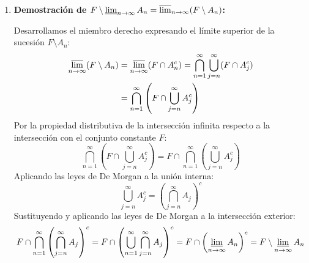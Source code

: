 \begin{problema}
\begin{enumerate}[label=\alph*)]
    Desarrollamos el miembro derecho expresando la diferencia como intersección con el complementario y aplicando la definición de límite inferior:
    \begin{align*}
        \varliminf_{n \to \infty} (F \setminus A_n) &= \varliminf_{n \to \infty} (F \cap A_n^c) = \bigcup_{n=1}^\infty \bigcap_{j=n}^\infty (F \cap A_j^c) \\
        &= \bigcup_{n=1}^\infty \left( F \cap \bigcap_{j=n}^\infty A_j^c \right)
    \end{align*}
    Por la propiedad distributiva de la unión respecto a la intersección con el conjunto constante $F$:
    \[
        \bigcup_{n=1}^\infty \left( F \cap \bigcap_{j=n}^\infty A_j^c \right) = F \cap \bigcup_{n=1}^\infty \left( \bigcap_{j=n}^\infty A_j^c \right)
    \]
    Aplicando las leyes de De Morgan a la intersección interna:
    \[
        \bigcap_{j=n}^\infty A_j^c = \left( \bigcup_{j=n}^\infty A_j \right)^c
    \]
    Sustituyendo y aplicando de nuevo las leyes de De Morgan a la unión exterior:
    \[
        F \cap \bigcup_{n=1}^\infty \left( \bigcup_{j=n}^\infty A_j \right)^c = F \cap \left( \bigcap_{n=1}^\infty \bigcup_{j=n}^\infty A_j \right)^c = F \cap \left( \varlimsup_{n \to \infty} A_n \right)^c = F \setminus \varlimsup_{n \to \infty} A_n
    \]

    \item \textbf{Demostración de $F \setminus \varliminf_{n \to \infty} A_n = \varlimsup_{n \to \infty} (F \setminus A_n)$:}

    Desarrollamos el miembro derecho expresando el límite superior de la sucesión $F \setminus A_n$:
    \begin{align*}
        \varlimsup_{n \to \infty} (F \setminus A_n) &= \varlimsup_{n \to \infty} (F \cap A_n^c) = \bigcap_{n=1}^\infty \bigcup_{j=n}^\infty (F \cap A_j^c) \\
        &= \bigcap_{n=1}^\infty \left( F \cap \bigcup_{j=n}^\infty A_j^c \right)
    \end{align*}
    Por la propiedad distributiva de la intersección infinita respecto a la intersección con el conjunto constante $F$:
    \[
        \bigcap_{n=1}^\infty \left( F \cap \bigcup_{j=n}^\infty A_j^c \right) = F \cap \bigcap_{n=1}^\infty \left( \bigcup_{j=n}^\infty A_j^c \right)
    \]
    Aplicando las leyes de De Morgan a la unión interna:
    \[
        \bigcup_{j=n}^\infty A_j^c = \left( \bigcap_{j=n}^\infty A_j \right)^c
    \]
    Sustituyendo y aplicando las leyes de De Morgan a la intersección exterior:
    \[
        F \cap \bigcap_{n=1}^\infty \left( \bigcap_{j=n}^\infty A_j \right)^c = F \cap \left( \bigcup_{n=1}^\infty \bigcap_{j=n}^\infty A_j \right)^c = F \cap \left( \varliminf_{n \to \infty} A_n \right)^c = F \setminus \varliminf_{n \to \infty} A_n
    \]
\end{enumerate}
\end{problema}
